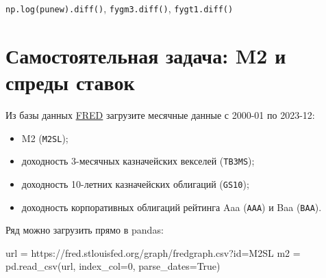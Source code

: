\documentclass[
  russian,
]{article}
\newenvironment{Shaded}{\begin{snugshade}}{\end{snugshade}}
\newcommand{\DecValTok}[1]{\textcolor[rgb]{0.68,0.00,0.00}{#1}}
\newcommand{\NormalTok}[1]{\textcolor[rgb]{0.00,0.23,0.31}{#1}}
\newcommand{\OperatorTok}[1]{\textcolor[rgb]{0.37,0.37,0.37}{#1}}
\newcommand{\StringTok}[1]{\textcolor[rgb]{0.13,0.47,0.30}{#1}}
\newcommand{\VariableTok}[1]{\textcolor[rgb]{0.07,0.07,0.07}{#1}}
\providecommand{\tightlist}{%
  \setlength{\itemsep}{0pt}\setlength{\parskip}{0pt}}
\begin{document}
\begin{tcolorbox}[enhanced jigsaw, arc=.35mm, bottomrule=.15mm, bottomtitle=1mm, breakable, colback=white, colbacktitle=quarto-callout-note-color!10!white, colframe=quarto-callout-note-color-frame, coltitle=black, left=2mm, leftrule=.75mm, opacityback=0, opacitybacktitle=0.6, rightrule=.15mm, title=\textcolor{quarto-callout-note-color}{\faInfo}\hspace{0.5em}{Коэффициенты, значимые на уровне 1\% (по робастным стандартным ошибкам
HAC)}, titlerule=0mm, toprule=.15mm, toptitle=1mm]

\texttt{np.log(punew).diff()}, \texttt{fygm3.diff()},
\texttt{fygt1.diff()}

\end{tcolorbox}

\section{Самостоятельная задача: M2 и спреды
ставок}\label{ux441ux430ux43cux43eux441ux442ux43eux44fux442ux435ux43bux44cux43dux430ux44f-ux437ux430ux434ux430ux447ux430-m2-ux438-ux441ux43fux440ux435ux434ux44b-ux441ux442ux430ux432ux43eux43a}

Из базы данных \href{https://fred.stlouisfed.org/}{FRED} загрузите
месячные данные с 2000-01 по 2023-12:

\begin{itemize}
\tightlist
\item
  M2 (\texttt{M2SL});
\item
  доходность 3-месячных казначейских векселей (\texttt{TB3MS});
\item
  доходность 10-летних казначейских облигаций (\texttt{GS10});
\item
  доходность корпоративных облигаций рейтинга Aaa (\texttt{AAA}) и Baa
  (\texttt{BAA}).
\end{itemize}

Ряд можно загрузить прямо в pandas:

\begin{Shaded}
\begin{Highlighting}[]
\NormalTok{url }\OperatorTok{=} \StringTok{\textquotesingle{}https://fred.stlouisfed.org/graph/fredgraph.csv?id=M2SL\textquotesingle{}}
\NormalTok{m2 }\OperatorTok{=}\NormalTok{ pd.read\_csv(url, index\_col}\OperatorTok{=}\DecValTok{0}\NormalTok{, parse\_dates}\OperatorTok{=}\VariableTok{True}\NormalTok{)}
\end{Highlighting}
\end{Shaded}
\end{document}
